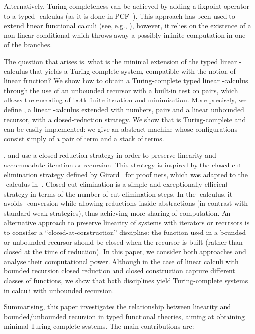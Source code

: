 \documentclass{article}
\begin{document}
Alternatively, Turing completeness can be achieved by adding a
fixpoint operator to a typed -calculus (as it is done in
PCF~\cite{Plotkin77}). This approach has been used to extend linear
functional calculi (see, e.g.,
\cite{MackieIC:lilfpl,PittsAM:opeplp,paolini08ppdp,Brauner94}),
however, it relies on the existence of a non-linear conditional which
throws away a possibly infinite computation in one of the branches.

The question that arises is, what is the minimal extension of the
typed linear -calculus that yields a Turing complete system,
compatible with the notion of linear function?  We show how to obtain
a Turing-complete typed linear -calculus through the use of
an unbounded recursor with a built-in test on pairs, which allows the
encoding of both finite iteration and minimisation. More precisely, we
define \LLCIrec, a linear -calculus extended with numbers,
pairs and a linear unbounded recursor, with a closed-reduction
strategy. We show that  is Turing-complete and can be easily
implemented: we give an abstract machine whose configurations consist 
simply of a pair of term and a stack of terms. 

\LLCI, \LLCIrec and \LLCIm use a closed-reduction strategy in order to
preserve linearity and accommodate iteration or recursion. This
strategy is inspired by the closed cut-elimination strategy defined by
Girard~\cite{GirardGOI} for proof nets, which was adapted to the
-calculus in~\cite{fernandezM:clores}.  Closed cut
elimination is a simple and exceptionally efficient strategy in terms
of the number of cut elimination steps.  In the -calculus, it
avoids -conversion while allowing reductions inside
abstractions (in contrast with standard weak strategies), thus
achieving more sharing of computation.  An alternative approach to
preserve linearity of systems with iterators or recursors is to
consider a ``closed-at-construction'' discipline: the function used in
a bounded or unbounded recursor should be closed when the recursor is
built (rather than closed at the time of reduction).  In this paper,
we consider both approaches and analyse their computational
power. Although in the case of linear calculi with bounded recursion
closed reduction and closed construction capture different classes of
functions, we show that both disciplines yield Turing-complete systems
in calculi with unbounded recursion.



Summarising, this paper investigates the relationship between linearity 
and bounded/unbounded recursion in typed functional theories, aiming at
obtaining minimal Turing complete systems. The main contributions are:
\end{document}
